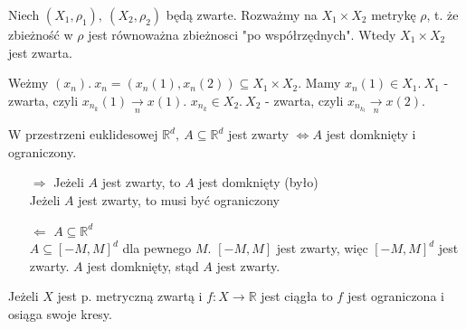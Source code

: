 \begin{tw} 
    Niech $(X_1,\rho_1),\ (X_2,\rho_2)$ będą zwarte. Rozważmy na $X_1 \times X_2$ metrykę $\rho$, t. że
    zbieżność w $\rho$ jest równoważna zbieżnosci "po współrzędnych". Wtedy $X_1 \times X_2$ jest zwarta.
\end{tw} 
\begin{dd} 
    Weżmy $(x_n). \ x_n = (x_n(1), x_n(2)) \subseteq X_1 \times X_2$. Mamy $x_n(1) \in X_1. \ X_1$ - zwarta, czyli $x_{n_k}(1) \underset{n}{\rightarrow} x(1)$. 
    $x_{n_k} \in X_2. \ X_2$ - zwarta, czyli $x_{n_{k_l}} \underset{n}{\rightarrow} x(2)$. 
\end{dd} 
\begin{tw} W przestrzeni euklidesowej $\mathbb{R}^d, \ A \subseteq \mathbb{R}^d$ jest zwarty $\Leftrightarrow A$ jest domknięty i ograniczony. \end{tw} 
\begin{dd}\hfill 
    \begin{itemize} 
        \item[$\Rightarrow$] Jeżeli $A$ jest zwarty, to $A$ jest domknięty (było) \\ 
            Jeżeli $A$ jest zwarty, to musi być ograniczony
        \item[$\Leftarrow$] $A \subseteq \mathbb{R}^d$ \\ 
            $ A \subseteq [-M,M]^d$ dla pewnego $M$. $[-M,M]$ jest zwarty, więc $[-M,M]^d$ jest zwarty. 
            $A$ jest domknięty, stąd $A$ jest zwarty.
    \end{itemize} 
\end{dd} 
\begin{wn} Jeżeli $X$ jest p. metryczną zwartą i $f: X \rightarrow \mathbb{R}$ jest ciągła to $f$ jest ograniczona i osiąga swoje kresy. \end{wn}
